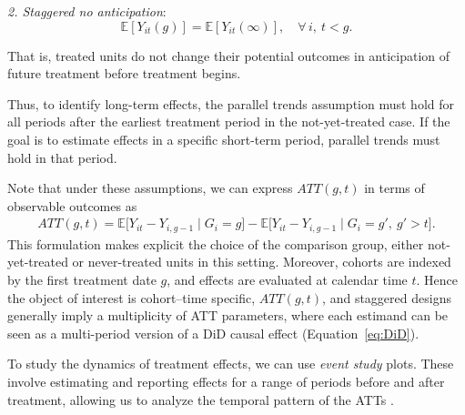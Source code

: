 \textit{2. Staggered no anticipation}:
\begin{equation*}
	\mathbb{E}[Y_{it}(g)] = \mathbb{E}[Y_{it}(\infty)], \quad \forall\, i,\ t < g.
\end{equation*}

That is, treated units do not change their potential outcomes in anticipation of future treatment before treatment begins.

Thus, to identify long-term effects, the parallel trends assumption must hold for all periods after the earliest treatment period in the not-yet-treated case. If the goal is to estimate effects in a specific short-term period, parallel trends must hold in that period.

Note that under these assumptions, we can express $ATT(g,t)$ in terms of observable outcomes as \cite{roth2023whats}
\begin{align*}
	ATT(g,t) 
	= \mathbb{E}\big[ Y_{it} - Y_{i, g-1} \mid G_i = g \big]
	- \mathbb{E}\big[ Y_{it} - Y_{i, g-1} \mid G_i = g', \ g' > t \big].
\end{align*}
This formulation makes explicit the choice of the comparison group, either not-yet-treated or never-treated units in this setting. Moreover, cohorts are indexed by the first treatment date $g$, and effects are evaluated at calendar time $t$. Hence the object of interest is cohort–time specific, $ATT(g,t)$, and staggered designs generally imply a multiplicity of ATT parameters, where each estimand can be seen as a multi-period version of a DiD causal effect (Equation~\ref{eq:DiD}).

To study the dynamics of treatment effects, we can use \textit{event study} plots. These involve estimating and reporting effects for a range of periods before and after treatment, allowing us to analyze the temporal pattern of the ATTs \cite{baker2025did_guide}. 

